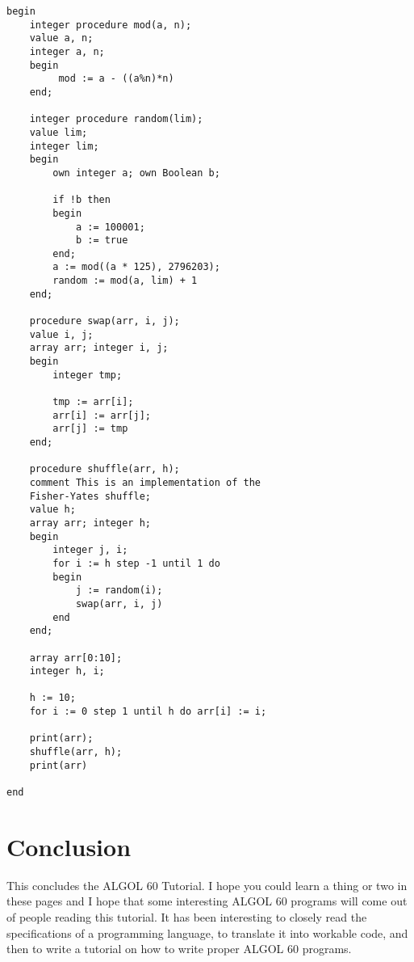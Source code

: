 \documentclass{article}
\begin{document}
\begin{lstlisting}[language={[60]algol}]
begin
    integer procedure mod(a, n);
    value a, n;
    integer a, n;
    begin
         mod := a - ((a%n)*n)
    end;
 
    integer procedure random(lim);
    value lim;
    integer lim;
    begin
        own integer a; own Boolean b;
        
        if !b then
        begin
            a := 100001;
            b := true
        end;
        a := mod((a * 125), 2796203);
        random := mod(a, lim) + 1
    end;

    procedure swap(arr, i, j);
    value i, j;
    array arr; integer i, j;
    begin
        integer tmp;

        tmp := arr[i];
        arr[i] := arr[j];
        arr[j] := tmp
    end;

    procedure shuffle(arr, h);
    comment This is an implementation of the 
    Fisher-Yates shuffle;
    value h;
    array arr; integer h;
    begin
        integer j, i;
        for i := h step -1 until 1 do
        begin
            j := random(i);
            swap(arr, i, j)
        end
    end;

    array arr[0:10];
    integer h, i;

    h := 10;
    for i := 0 step 1 until h do arr[i] := i;

    print(arr);
    shuffle(arr, h);
    print(arr)

end
\end{lstlisting}

\section{Conclusion}
This concludes the ALGOL 60 Tutorial. I hope you could learn a thing or two in these pages and I hope that some interesting ALGOL 60 programs will come out of people reading this tutorial. It has been interesting to closely read the specifications of a programming language, to translate it into workable code, and then to write a tutorial on how to write proper ALGOL 60 programs.

\newpage


\end{document}
